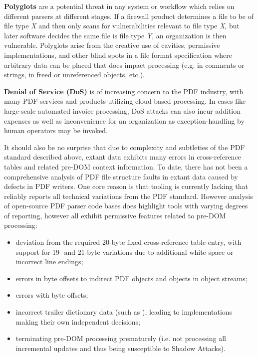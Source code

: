 {\bf{Polyglots}} are a potential threat in any system or workflow which relies on different parsers
at different stages. If a firewall product determines a file to be of file type \emph{X} and then only 
scans for vulnerabilities relevant to file type \emph{X}, but later software decides the same file 
is file type \emph{Y}, an organization is then vulnerable. Polyglots arise from the creative use of
cavities, permissive implementations, 
and other blind spots in a file format specification where arbitrary data can be placed 
that does impact processing (e.g. in comments or strings, in freed or unreferenced objects, etc.).

{\bf{Denial of Service (DoS)}} is of increasing concern to the PDF industry, with many PDF services
and products utilizing cloud-based processing. In cases like large-scale automated invoice 
processing, DoS attacks can also incur addition expenses as well as inconvenience for an organization 
as exception-handling by human operators may be invoked.  

It should also be no surprise that due to complexity and subtleties of the PDF standard described above,
extant data exhibits many errors in cross-reference tables and related pre-DOM context information.
To date, there has not been a comprehensive analysis of PDF file structure faults in extant data
caused by defects in PDF writers. One core reason is that tooling is currently lacking that reliably reports
all technical variations from the PDF standard. However analysis of open-source PDF parser code bases
does highlight tools with varying degrees of reporting, however all exhibit permissive features related
to pre-DOM processing:

\begin{itemize}
    \item deviation from the required 20-byte fixed cross-reference table entry, with support for
    19- and 21-byte variations due to additional white space or incorrect line endings;
    \item errors in byte offsets to indirect PDF objects and objects in object streams;
    \item errors with  byte offsets;
    \item incorrect trailer dictionary data (such as ), leading to implementations 
    making their own independent decisions;  
    \item terminating pre-DOM processing prematurely (i.e. not processing all incremental updates and thus 
    being susceptible to Shadow Attacks).
\end{itemize}
